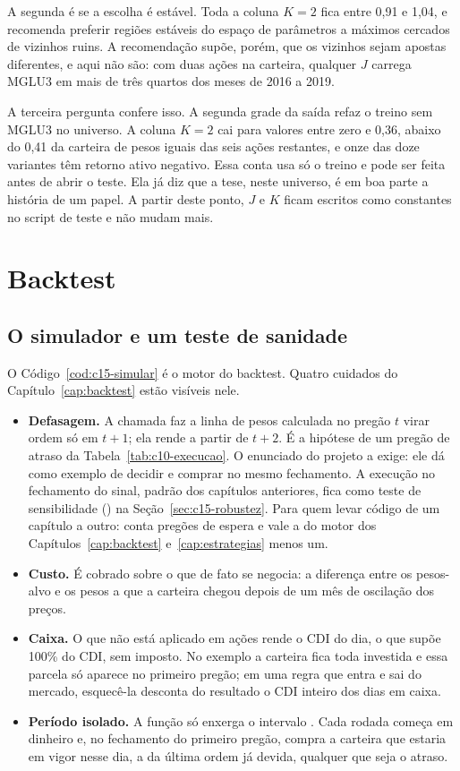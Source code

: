 A segunda é se a escolha é estável. Toda a coluna $K = 2$ fica entre 0,91 e 1,04, e \citet{pardo2008} recomenda preferir regiões estáveis do espaço de parâmetros a máximos cercados de vizinhos ruins. A recomendação supõe, porém, que os vizinhos sejam apostas diferentes, e aqui não são: com duas ações na carteira, qualquer $J$ carrega MGLU3 em mais de três quartos dos meses de 2016 a 2019.

A terceira pergunta confere isso. A segunda grade da saída refaz o treino sem MGLU3 no universo. A coluna $K = 2$ cai para valores entre zero e 0,36, abaixo do 0,41 da carteira de pesos iguais das seis ações restantes, e onze das doze variantes têm retorno ativo negativo. Essa conta usa só o treino e pode ser feita antes de abrir o teste. Ela já diz que a tese, neste universo, é em boa parte a história de um papel. A partir deste ponto, $J$ e $K$ ficam escritos como constantes no script de teste e não mudam mais.

\section{Backtest}
\label{sec:c15-backtest}

\subsection{O simulador e um teste de sanidade}

O Código~\ref{cod:c15-simular} é o motor do backtest. Quatro cuidados do Capítulo~\ref{cap:backtest} estão visíveis nele.

\begin{itemize}
  \item \textbf{Defasagem.} A chamada  faz a linha de pesos calculada no pregão $t$ virar ordem só em $t+1$; ela rende a partir de $t+2$. É a hipótese de um pregão de atraso da Tabela~\ref{tab:c10-execucao}. O enunciado do projeto a exige: ele dá como exemplo de  decidir e comprar no mesmo fechamento. A execução no fechamento do sinal, padrão dos capítulos anteriores, fica como teste de sensibilidade () na Seção~\ref{sec:c15-robustez}. Para quem levar código de um capítulo a outro:  conta pregões de espera e vale a  do motor dos Capítulos~\ref{cap:backtest} e~\ref{cap:estrategias} menos um.
  \item \textbf{Custo.} É cobrado sobre o que de fato se negocia: a diferença entre os pesos-alvo e os pesos a que a carteira chegou depois de um mês de oscilação dos preços.
  \item \textbf{Caixa.} O que não está aplicado em ações rende o CDI do dia, o que supõe 100\% do CDI, sem imposto. No exemplo a carteira fica toda investida e essa parcela só aparece no primeiro pregão; em uma regra que entra e sai do mercado, esquecê-la desconta do resultado o CDI inteiro dos dias em caixa.
  \item \textbf{Período isolado.} A função só enxerga o intervalo . Cada rodada começa em dinheiro e, no fechamento do primeiro pregão, compra a carteira que estaria em vigor nesse dia, a da última ordem já devida, qualquer que seja o atraso.
\end{itemize}

